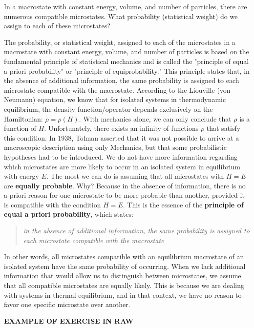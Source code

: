 \documentclass[12pt,a4paper]{report}
\newcommand{\esp}{\vspace{0.5cm}}
\begin{document}
	\esp
	
	In a macrostate with constant energy, volume, and number of particles, there are numerous compatible microstates. What probability (statistical weight) do we assign to each of these microstates?
	
	\esp
	
	The probability, or statistical weight, assigned to each of the microstates in a macrostate with constant energy, volume, and number of particles is based on the fundamental principle of statistical mechanics and is called the "principle of equal a priori probability" or "principle of equiprobability." This principle states that, in the absence of additional information, the same probability is assigned to each microstate compatible with the macrostate. According to the Liouville (von Neumann) equation, we know that for isolated systems in thermodynamic equilibrium, the density function/operator depends exclusively on the Hamiltonian: $\rho = \rho(H)$. With mechanics alone, we can only conclude that $\rho$ is a function of $H$. Unfortunately, there exists an infinity of functions $\rho$ that satisfy this condition. In 1938, Tolman asserted that it was not possible to arrive at a macroscopic description using only Mechanics, but that some probabilistic hypotheses had to be introduced. We do not have more information regarding which microstates are more likely to occur in an isolated system in equilibrium with energy $E$. The most we can do is assuming that all microstates with $H = E$ are \textbf{equally probable}. Why? Because in the absence of information, there is no a priori reason for one microstate to be more probable than another, provided it is compatible with the condition $H = E$. This is the essence of the \textbf{principle of equal a priori probability}, which states:
	
	\esp
	
	\begin{quote}
		\textit{in the absence of additional information, the same probability is assigned to each microstate compatible with the macrostate}
	\end{quote}
	
	\esp
	
	In other words, all microstates compatible with an equilibrium macrostate of an isolated system have the same probability of occurring. When we lack additional information that would allow us to distinguish between microstates, we assume that all compatible microstates are equally likely. This is because we are dealing with systems in thermal equilibrium, and in that context, we have no reason to favor one specific microstate over another.
	
	\esp
	
	\noindent \textbf{EXAMPLE OF EXERCISE IN RAW}
	
	\printbibliography[title={Bibliografía}]
\end{document}
